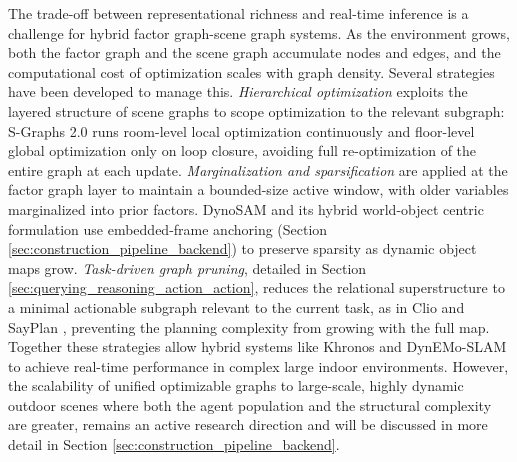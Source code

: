 The trade-off between representational richness and real-time inference is a challenge for hybrid factor graph-scene graph systems.
As the environment grows, both the factor graph and the scene graph accumulate nodes and edges, and the computational cost of optimization scales with graph density.
Several strategies have been developed to manage this.
\textit{Hierarchical optimization} exploits the layered structure of scene graphs to scope optimization to the relevant subgraph: S-Graphs 2.0 \cite{bavle_s-graphs_2025} runs room-level local optimization continuously and floor-level global optimization only on loop closure, avoiding full re-optimization of the entire graph at each update.
\textit{Marginalization and sparsification} are applied at the factor graph layer to maintain a bounded-size active window, with older variables marginalized into prior factors. 
DynoSAM \cite{morris_dynosam_2025} and its hybrid world-object centric formulation \cite{morris_online_2025} use embedded-frame anchoring (Section \ref{sec:construction_pipeline_backend}) to preserve sparsity as dynamic object maps grow.
\textit{Task-driven graph pruning}, detailed in Section \ref{sec:querying_reasoning_action_action}, reduces the relational superstructure to a minimal actionable subgraph relevant to the current task, as in Clio \cite{maggio_clio_2024} and SayPlan \cite{rana2023sayplangroundinglargelanguage}, preventing the planning complexity from growing with the full map. 
Together these strategies allow hybrid systems like Khronos \cite{schmid_khronos_2024} and DynEMo-SLAM \cite{giberna_dynemo-slam_2025} to achieve real-time performance in complex large indoor environments. However, the scalability of unified optimizable graphs to large-scale, highly dynamic outdoor scenes where both the agent population and the structural complexity are greater, remains an active research direction and will be discussed in more detail in Section \ref{sec:construction_pipeline_backend}.





